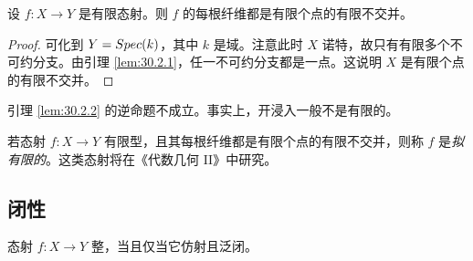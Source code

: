 \begin{lemma}\label{lem:30.2.2}
设 $f\colon X\to Y$ 是有限态射。则 $f$ 的每根纤维都是有限个点的有限不交并。
\end{lemma}

\begin{proof}
可化到 $Y=Spec(k)$，其中 $k$ 是域。注意此时 $X$ 诺特，故只有有限多个不可约分支。由引理 \ref{lem:30.2.1}，任一不可约分支都是一点。这说明 $X$ 是有限个点的有限不交并。
\end{proof}

\begin{warning}\label{warn:30.2.3}
引理 \ref{lem:30.2.2} 的逆命题不成立。事实上，开浸入一般不是有限的。
\end{warning}

\begin{remark}\label{rem:30.2.4}
若态射 $f\colon X\to Y$ 有限型，且其每根纤维都是有限个点的有限不交并，则称 $f$ 是\emph{拟有限的}。这类态射将在《代数几何 II》中研究。
\end{remark}

\subsection{闭性}\label{sec:30.3}

\begin{proposition}\label{prop:30.3.1}
态射 $f\colon X\to Y$ 整，当且仅当它仿射且泛闭。
\end{proposition}

